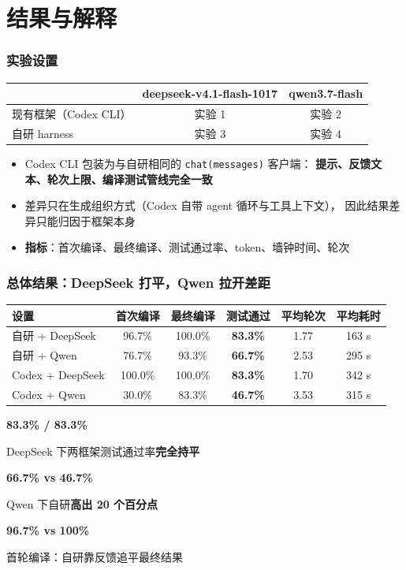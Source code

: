 \documentclass[10pt,aspectratio=169]{beamer}
\newcommand{\statbox}[2]{%
  \begin{minipage}[t]{0.31\linewidth}\centering
    {\color{blue!65!black}\bfseries\Large #1}\par\vspace{1pt}
    {\scriptsize #2}%
  \end{minipage}}
\begin{document}
\section{结果与解释}

\begin{frame}
  \frametitle{实验设置}

  \centering
  \begin{tabular}{lcc}
    \hline
     & deepseek-v4.1-flash-1017 & qwen3.7-flash \\
    \hline
    现有框架（Codex CLI） & 实验 1 & 实验 2 \\
    自研 harness          & 实验 3 & 实验 4 \\
    \hline
  \end{tabular}

  \vspace{2.5mm}
  \begin{itemize}
    \item Codex CLI 包装为与自研相同的 \texttt{chat(messages)} 客户端：
          \textbf{提示、反馈文本、轮次上限、编译测试管线完全一致}
    \item 差异只在生成组织方式（Codex 自带 agent 循环与工具上下文），
          因此结果差异只能归因于框架本身
    \item \textbf{指标}：首次编译、最终编译、测试通过率、token、墙钟时间、轮次
  \end{itemize}

\end{frame}

\begin{frame}
  \frametitle{总体结果：DeepSeek 打平，Qwen 拉开差距}

  \centering
  \small
  \setlength{\tabcolsep}{6pt}
  \renewcommand{\arraystretch}{1.25}
  \begin{tabular}{lccccc}
    \hline
    设置 & 首次编译 & 最终编译 & 测试通过 & 平均轮次 & 平均耗时 \\
    \hline
    自研 + DeepSeek  & 96.7\%  & 100.0\% & \textbf{83.3\%} & 1.77 & 163 s \\
    自研 + Qwen      & 76.7\%  & 93.3\%  & \textbf{66.7\%} & 2.53 & 295 s \\
    Codex + DeepSeek & 100.0\% & 100.0\% & \textbf{83.3\%} & 1.70 & 342 s \\
    \rowcolor{red!12}
    Codex + Qwen     & 30.0\%  & 83.3\%  & \textbf{46.7\%} & 3.53 & 315 s \\
    \hline
  \end{tabular}

  \vspace{2.5mm}
  \statbox{83.3\% / 83.3\%}{DeepSeek 下两框架测试通过率\textbf{完全持平}}
  \hfill
  \statbox{66.7\% vs 46.7\%}{Qwen 下自研\textbf{高出 20 个百分点}}
  \hfill
  \statbox{96.7\% vs 100\%}{首轮编译：自研靠反馈追平最终结果}
\end{frame}
\end{document}
